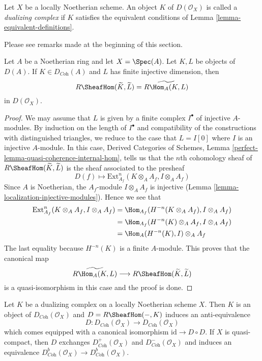 \begin{definition}
\label{definition-dualizing-scheme}
Let $X$ be a locally Noetherian scheme. An object $K$ of
$D(\mathcal{O}_X)$ is called a {\it dualizing complex} if
$K$ satisfies the equivalent conditions of
Lemma \ref{lemma-equivalent-definitions}.
\end{definition}

\noindent
Please see remarks made at the beginning of this section.

\begin{lemma}
\label{lemma-affine-duality}
Let $A$ be a Noetherian ring and let $X = \Spec(A)$. Let $K, L$ be objects
of $D(A)$. If $K \in D_{\textit{Coh}}(A)$ and $L$ has finite injective
dimension, then
$$
R\SheafHom(\widetilde{K}, \widetilde{L})
=
\widetilde{R\Hom_A(K, L)}
$$
in $D(\mathcal{O}_X)$.
\end{lemma}

\begin{proof}
We may assume that $L$ is given by a finite complex $I^\bullet$
of injective $A$-modules. By induction on the length of $I^\bullet$
and compatibility of the constructions with distinguished triangles,
we reduce to the case that $L = I[0]$ where $I$ is an injective $A$-module.
In this case, Derived Categories of Schemes, Lemma
\ref{perfect-lemma-quasi-coherence-internal-hom}, tells us that
the $n$th cohomology sheaf of $R\SheafHom(\widetilde{K}, \widetilde{L})$
is the sheaf associated to the presheaf
$$
D(f) \longmapsto \text{Ext}^n_{A_f}(K \otimes_A A_f, I \otimes_A A_f)
$$
Since $A$ is Noetherian, the $A_f$-module $I \otimes_A A_f$ is injective
(Lemma \ref{lemma-localization-injective-modules}). Hence we see that
\begin{align*}
\text{Ext}^n_{A_f}(K \otimes_A A_f, I \otimes_A A_f)
& =
\Hom_{A_f}(H^{-n}(K \otimes_A A_f), I \otimes_A A_f) \\
& =
\Hom_{A_f}(H^{-n}(K) \otimes_A A_f, I \otimes_A A_f) \\
& =
\Hom_A(H^{-n}(K), I) \otimes_A A_f
\end{align*}
The last equality because $H^{-n}(K)$ is a finite $A$-module.
This proves that the canonical map
$$
\widetilde{R\Hom_A(K, L)}
\longrightarrow
R\SheafHom(\widetilde{K}, \widetilde{L})
$$
is a quasi-isomorphism in this case and the proof is done.
\end{proof}

\begin{lemma}
\label{lemma-dualizing-schemes}
Let $K$ be a dualizing complex on a locally Noetherian scheme $X$.
Then $K$ is an object of $D_{\textit{Coh}}(\mathcal{O}_X)$
and $D = R\SheafHom(-, K)$ induces an anti-equivalence
$$
D :
D_{\textit{Coh}}(\mathcal{O}_X)
\longrightarrow
D_{\textit{Coh}}(\mathcal{O}_X)
$$
which comes equipped with a canonical isomorphism
$\text{id} \to D \circ D$. If $X$ is quasi-compact, then
$D$ exchanges $D^+_{\textit{Coh}}(\mathcal{O}_X)$ and
$D^-_{\textit{Coh}}(\mathcal{O}_X)$ and induces an equivalence
$D^b_{\textit{Coh}}(\mathcal{O}_X) \to D^b_{\textit{Coh}}(\mathcal{O}_X)$.
\end{lemma}

